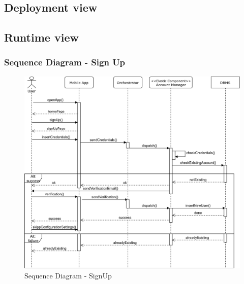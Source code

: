 \subsection{Deployment view}
	
\subsection{Runtime view}
	\label{sect:RuntimeView}
	\subsubsection{Sequence Diagram - Sign Up}
	\begin{figure}[H]
		\centerline{\includegraphics[width=0.9\paperwidth]{Images/signUp}}
		\caption{Sequence Diagram - SignUp}
	\end{figure}
	

